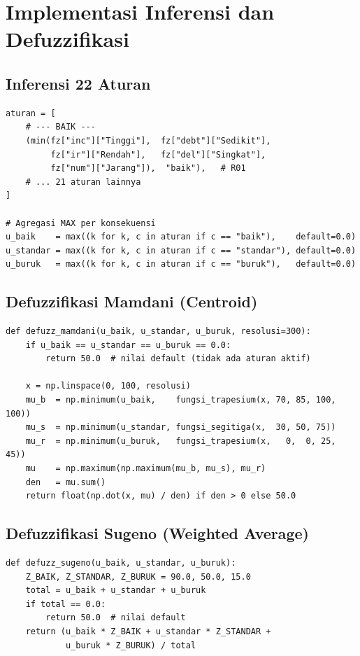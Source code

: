 \documentclass[12pt,a4paper]{report}
\begin{document}
\section{Implementasi Inferensi dan Defuzzifikasi}

\subsection{Inferensi 22 Aturan}

\begin{lstlisting}[caption={Inferensi 22 aturan dengan operator AND (minimum)}]
aturan = [
    # --- BAIK ---
    (min(fz["inc"]["Tinggi"],  fz["debt"]["Sedikit"],
         fz["ir"]["Rendah"],   fz["del"]["Singkat"],
         fz["num"]["Jarang"]),  "baik"),   # R01
    # ... 21 aturan lainnya
]

# Agregasi MAX per konsekuensi
u_baik    = max((k for k, c in aturan if c == "baik"),    default=0.0)
u_standar = max((k for k, c in aturan if c == "standar"), default=0.0)
u_buruk   = max((k for k, c in aturan if c == "buruk"),   default=0.0)
\end{lstlisting}

\subsection{Defuzzifikasi Mamdani (Centroid)}

\begin{lstlisting}[caption={Defuzzifikasi Mamdani menggunakan metode Centroid}]
def defuzz_mamdani(u_baik, u_standar, u_buruk, resolusi=300):
    if u_baik == u_standar == u_buruk == 0.0:
        return 50.0  # nilai default (tidak ada aturan aktif)

    x = np.linspace(0, 100, resolusi)
    mu_b  = np.minimum(u_baik,    fungsi_trapesium(x, 70, 85, 100, 100))
    mu_s  = np.minimum(u_standar, fungsi_segitiga(x,  30, 50, 75))
    mu_r  = np.minimum(u_buruk,   fungsi_trapesium(x,   0,  0, 25, 45))
    mu    = np.maximum(np.maximum(mu_b, mu_s), mu_r)
    den   = mu.sum()
    return float(np.dot(x, mu) / den) if den > 0 else 50.0
\end{lstlisting}

\subsection{Defuzzifikasi Sugeno (Weighted Average)}

\begin{lstlisting}[caption={Defuzzifikasi Sugeno menggunakan Weighted Average}]
def defuzz_sugeno(u_baik, u_standar, u_buruk):
    Z_BAIK, Z_STANDAR, Z_BURUK = 90.0, 50.0, 15.0
    total = u_baik + u_standar + u_buruk
    if total == 0.0:
        return 50.0  # nilai default
    return (u_baik * Z_BAIK + u_standar * Z_STANDAR +
            u_buruk * Z_BURUK) / total
\end{lstlisting}
\end{document}
